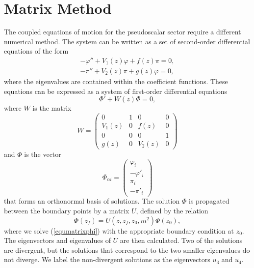 \section{Matrix Method}\label{appMatrix}

The coupled equations of motion for the pseudoscalar sector require a different numerical method.
The system can be written as a set of second-order differential equations of the form
\begin{eqnarray}
-\varphi'' + V_1(z)  \varphi + f(z)\pi  = 0, \label{equphiAppend}\\
-\pi'' + V_2(z) \pi + g(z)\varphi = 0, \label{equpiAppend}
\end{eqnarray}
where the eigenvalues are contained within the coefficient functions. 
These equations can be expressed as a system of first-order differential equations
\begin{equation} \label{equmatrixphi}
\Phi' + W(z) \Phi = 0,
\end{equation}
where $W$ is the matrix
\begin{equation}
W = \left(\begin{array}{cccc}
0     & 1     & 0     & 0 \\ 
V_1(z)& 0     &   f(z)& 0 \\
0     & 0     & 0     & 1 \\
g(z)  & 0     & V_2(z)& 0
\end{array}\right)
\end{equation}
and $\Phi$ is the vector
\begin{equation}
\Phi_{\alpha i} = \left(\begin{array}{c} \varphi_{i} \\
			-\varphi'_{i} \\
			\pi_{i} \\
			-\pi'_{i} \end{array}\right)		
\end{equation}
that forms an orthonormal basis of solutions. 
The solution $\Phi$ is propagated between the boundary points by a matrix $U$, defined by the relation
\begin{equation}
\Phi(z_f) = U(z, z_f, z_0, m^2)\Phi(z_0),
\end{equation}
where we solve (\ref{equmatrixphi}) with the appropriate boundary condition at $z_0$. 
The eigenvectors and eigenvalues of $U$ are then calculated. 
Two of the solutions are divergent, but the solutions that correspond to the two smaller eigenvalues do not diverge.
We label the non-divergent solutions as the eigenvectors $u_3$ and $u_4$. 
